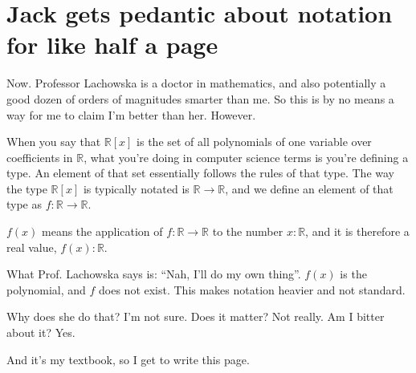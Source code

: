 \chapter{Jack gets pedantic about notation for like half a page}

Now. Professor Lachowska is a doctor in mathematics, and also potentially a good dozen of orders of magnitudes smarter than me. So this is by no means a way for me to claim I'm better than her. However. 

When you say that $\mathbb{R}[x]$ is the set of all polynomials of one variable over coefficients in $\mathbb{R}$, what you're doing in computer science terms is you're defining a type. An element of that set essentially follows the rules of that type. The way the type $\mathbb{R}[x]$ is typically notated is $\mathbb{R} \to \mathbb{R}$, and we define an element of that type as $f: \mathbb{R} \to \mathbb{R}$. 

$f(x)$ means the application of $f: \mathbb{R} \to \mathbb{R}$ to the number $x: \mathbb{R}$, and it is therefore a real value, $f(x): \mathbb{R}$. 

What Prof. Lachowska says is: ``Nah, I'll do my own thing''. $f(x)$ is the polynomial, and $f$ does not exist. This makes notation heavier and not standard. 

Why does she do that? I'm not sure. Does it matter? Not really. Am I bitter about it? Yes. 

And it's my textbook, so I get to write this page. 